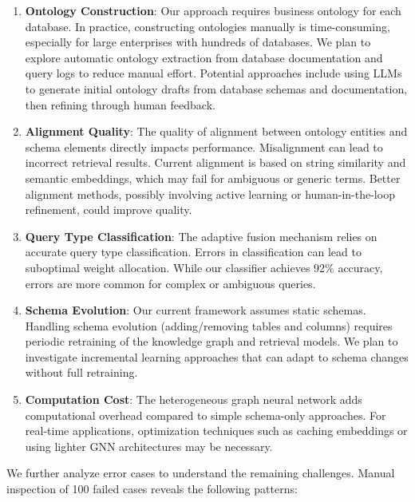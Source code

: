 \documentclass[sigconf, nonatbib]{acmart}
\begin{document}
\begin{enumerate}
    \item \textbf{Ontology Construction}: Our approach requires business ontology for each database. In practice, constructing ontologies manually is time-consuming, especially for large enterprises with hundreds of databases. We plan to explore automatic ontology extraction from database documentation and query logs to reduce manual effort. Potential approaches include using LLMs to generate initial ontology drafts from database schemas and documentation, then refining through human feedback.
    
    \item \textbf{Alignment Quality}: The quality of alignment between ontology entities and schema elements directly impacts performance. Misalignment can lead to incorrect retrieval results. Current alignment is based on string similarity and semantic embeddings, which may fail for ambiguous or generic terms. Better alignment methods, possibly involving active learning or human-in-the-loop refinement, could improve quality.
    
    \item \textbf{Query Type Classification}: The adaptive fusion mechanism relies on accurate query type classification. Errors in classification can lead to suboptimal weight allocation. While our classifier achieves 92\% accuracy, errors are more common for complex or ambiguous queries.
    
    \item \textbf{Schema Evolution}: Our current framework assumes static schemas. Handling schema evolution (adding/removing tables and columns) requires periodic retraining of the knowledge graph and retrieval models. We plan to investigate incremental learning approaches that can adapt to schema changes without full retraining.
    
    \item \textbf{Computation Cost}: The heterogeneous graph neural network adds computational overhead compared to simple schema-only approaches. For real-time applications, optimization techniques such as caching embeddings or using lighter GNN architectures may be necessary.
\end{enumerate}

We further analyze error cases to understand the remaining challenges. Manual inspection of 100 failed cases reveals the following patterns:
\end{document}
